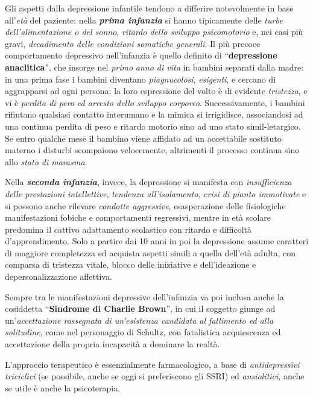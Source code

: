 \documentclass[]{article}
\begin{document}
Gli aspetti dalla depressione infantile tendono a differire notevolmente
in base all'\emph{età} del paziente: nella \textbf{\emph{prima
infanzia}} si hanno tipicamente delle \emph{turbe dell'alimentazione o
del sonno}, \emph{ritardo dello sviluppo psicomotorio} e, nei casi più
gravi, \emph{decadimento delle condizioni somatiche generali}. Il più
precoce comportamento depressivo nell'infanzia è quello definito di
``\textbf{depressione anaclitica}'', che insorge nel \emph{primo}
\emph{anno di vita} in bambini separati dalla madre: in una prima fase i
bambini diventano \emph{piagnucolosi}, \emph{esigenti}, e cercano di
aggrapparsi ad ogni persona; la loro espressione del volto è di evidente
\emph{tristezza}, e vi è \emph{perdita di pero ed arresto dello sviluppo
corporeo}. Successivamente, i bambini rifiutano qualsiasi contatto
interumano e la mimica si irrigidisce, associandosi ad una continua
perdita di peso e ritardo motorio sino ad uno stato simil-letargico. Se
entro qualche mese il bambino viene affidato ad un accettabile sostituto
materno i disturbi scompaiono velocemente, altrimenti il processo
continua sino allo \emph{stato di marasma}.

Nella \textbf{\emph{seconda infanzia}}, invece, la depressione si
manifesta con \emph{insufficienza delle prestazioni intellettive},
\emph{tendenza all'isolamento}, \emph{crisi di pianto immotivate} e si
possono anche rilevare \emph{condotte aggressive}, esasperazione delle
fisiologiche manifestazioni fobiche e comportamenti regressivi, mentre
in età scolare predomina il cattivo adattamento scolastico con ritardo e
difficoltà d'apprendimento. Solo a partire dai 10 anni in poi la
depressione assume caratteri di maggiore completezza ed acquista aspetti
simili a quella dell'età adulta, con comparsa di tristezza vitale,
blocco delle iniziative e dell'ideazione e depersonalizzazione
affettiva.

Sempre tra le manifestazioni depressive dell'infanzia va poi inclusa
anche la cosiddetta ``\textbf{Sindrome di Charlie Brown}'', in cui il
soggetto giunge ad un'\emph{accettazione rassegnata di un'esistenza
candidata al fallimento ed alla solitudine}, come nel personaggio di
Schultz, con fatalistica acquiescenza ed accettazione della propria
incapacità a dominare la realtà.

L'approccio terapeutico è essenzialmente farmacologico, a base di
\emph{antidepressivi triciclici} (se possibile, anche se oggi si
preferiscono gli SSRI) ed \emph{ansiolitici}, anche se utile è anche la
psicoterapia.
\end{document}
